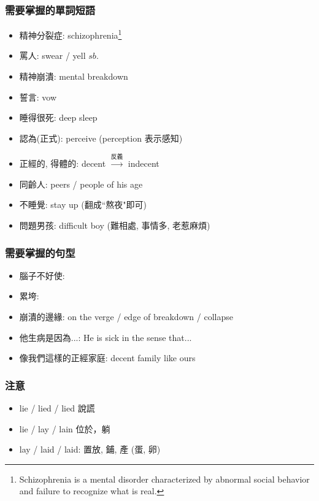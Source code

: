 \subsubsection*{需要掌握的單詞短語}
\begin{multicols}{2}
\begin{itemize}
  \itemsep0em
  \item 精神分裂症: schizophrenia\footnote{Schizophrenia is a mental disorder characterized by abnormal social behavior and failure to recognize what is real.}
  \item 罵人: swear / yell  $sb.$
  \item 精神崩潰: mental breakdown
  \item 誓言: vow
  \item 睡得很死: deep sleep
  \item 認為(正式): perceive (perception 表示感知)
  \item 正經的, 得體的: decent $\xrightarrow{\text{反義}}$ indecent
  \item 同齡人: peers / people of his age
  \item 不睡覺: stay up (翻成``熬夜"即可)
  \item 問題男孩: difficult boy (難相處, 事情多, 老惹麻煩)
\end{itemize}
\end{multicols}

\subsubsection*{需要掌握的句型}
\begin{itemize}
  \itemsep0em
  \item 腦子不好使: 
  \item 累垮: 
  \item 崩潰的邊緣: on the verge / edge of breakdown / collapse
  \item 他生病是因為...: He is sick in the sense that...
  \item 像我們這樣的正經家庭: decent family like ours
\end{itemize}

\subsubsection*{注意}
\begin{multicols}{2}
\begin{itemize}
  \itemsep0em
  \item lie / lied / lied 說謊
  \item lie / lay / lain 位於，躺
  \item lay / laid / laid: 置放, 鋪, 產 (蛋, 卵)
\end{itemize}
\end{multicols}

